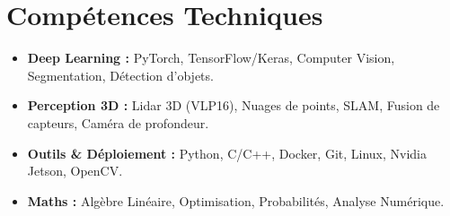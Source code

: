 \documentclass[a4paper,11pt]{article}
\begin{document}
\section{Compétences Techniques}
\begin{itemize}[leftmargin=*, nosep]
    \item \small{\textbf{Deep Learning :} PyTorch, TensorFlow/Keras, Computer Vision, Segmentation, Détection d'objets.}
    \item \small{\textbf{Perception 3D :} Lidar 3D (VLP16), Nuages de points, SLAM, Fusion de capteurs, Caméra de profondeur.}
    \item \small{\textbf{Outils \& Déploiement :} Python, C/C++, Docker, Git, Linux, Nvidia Jetson, OpenCV.}
    \item \small{\textbf{Maths :} Algèbre Linéaire, Optimisation, Probabilités, Analyse Numérique.}
\end{itemize}

\end{document}
